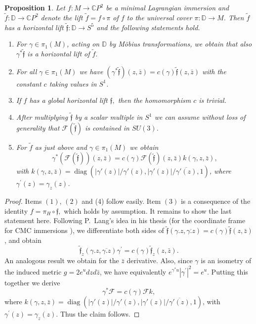 \documentclass[a4paper,11pt]{amsart}
\newtheorem{proposition}[theorem]{Proposition}
\theoremstyle{definition}
\numberwithin{equation}{section}
\newcommand{\C}{\mathbb{C}}
\newcommand{\D}{\mathbb{D}}
\newcommand{\f}{\mathfrak{f}}
\newcommand{\di}{\operatorname{diag}}
\begin{document}
 \begin{proposition}\label{prop:general}
 Let  $f : M \rightarrow \C P^2$ be a minimal Lagrangian  immersion  and $\tilde{f} : \D \rightarrow \C P^2$ denote the lift $\tilde{f} = f \circ \pi $ of $f$ to the 
 universal cover $\pi : \D \rightarrow M$.
 Then  $\tilde{f} $ has a horizontal lift  $\tilde{\f} : \D \rightarrow S^5 $ and the following statements hold.
 \begin{enumerate}
 \item For $\gamma \in \pi_1(M)$, acting on $\D$ by M\"{o}bius transformations, we obtain that also  $\gamma^*\tilde{\f} $  is a horizontal lift of  $\tilde{f} .$
 
 \item For all $\gamma \in \pi_1 (M)$ we have 
 $(\gamma^*\tilde{\f} ) (z, \bar{z}) = c(\gamma) \tilde{\f} (z, \bar z)$  with the constant $c$ taking values in $S^1$.
 
 \item If $f$ has a global horizontal lift $\f,$ then the homomorphism $c$ is trivial.
 
 \item After  multiplying $\tilde{\f}$ by a scalar multiple in $S^1$ we can assume without loss of generality that 
  $\mathcal{F}(\tilde{\f} )$ is contained in $SU(3)$.
  
  \item For $\tilde{f}$ as just above and $\gamma \in \pi_1 (M)$ we obtain
  \begin{equation} \label{define k}
  \gamma^*( \mathcal{F}(\tilde{\f} ) )(z, \bar z) = c(\gamma) \mathcal{F}(\tilde{\f} ) (z, \bar z) k(\gamma, z ,\bar z),
  \end{equation}
  with $k(\gamma, z ,\bar z) = \di (|\gamma'(z)| / \gamma'(z), |\gamma'(z)| / \overline{\gamma'(z)},1)$, where $\gamma^{\prime}(z) =\gamma_z (z)$.
 \end{enumerate}
  \end{proposition} 
   
 \begin{proof} 
Items $(1)$, $(2)$ and (4) follow easily. Item $(3)$ is a consequence of the identity $f = \pi_H \circ \f,$
which holds by assumption.
It remains to  show the last statement here.
Following P.~Lang's idea in his thesis (for the coordinate frame for CMC immersions  \cite{PLang}), 
we differentiate both sides of $\tilde{\f}(\gamma.z, \overline{\gamma. z})=c(\gamma) \tilde{\f}(z, \bar{z})$, and obtain
$$\tilde{\f}_z (\gamma . z,\overline{\gamma. z}) \gamma^{\prime} = 
c(\gamma) \tilde{\f}_z(z, \bar z).$$
An analogous  result we obtain for  the $\bar z$ derivative. 
Also, since $\gamma$ is an isometry of the induced metric $g=2e^{u} dzd{\bar z}$, we have  equivalently $e^{\gamma^*u} |\gamma^{\prime}|^2 = e^u$.
Putting this together we derive 
$$\gamma^* \mathcal{F}  = c(\gamma) \mathcal{F} k,$$
where  $k(\gamma, z ,\bar z) = \di (|\gamma'(z)| / \gamma'(z),  
|\gamma'(z)| / \overline{\gamma'(z)},1)$, with $\gamma^{\prime}(z) =\gamma_z (z).$
Thus the claim follows. 
 \end{proof}
 
\end{document}
